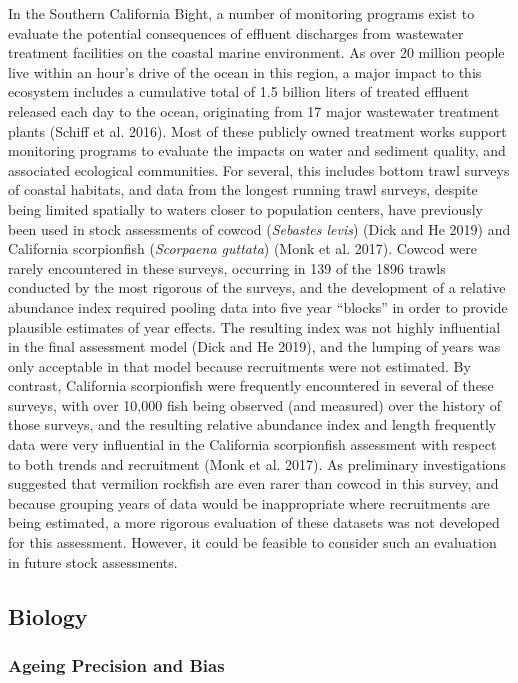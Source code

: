 \documentclass[
  english,
  a4paper,
]{article}
\begin{document}
In the Southern California Bight, a number of monitoring programs exist to evaluate the potential consequences of effluent discharges from wastewater treatment facilities on the coastal marine environment. As over 20 million people live within an hour's drive of the ocean in this region, a major impact to this ecosystem includes a cumulative total of 1.5 billion liters of treated effluent released each day to the ocean, originating from 17 major wastewater treatment plants (Schiff et al. 2016). Most of these publicly owned treatment works support monitoring programs to evaluate the impacts on water and sediment quality, and associated ecological communities. For several, this includes bottom trawl surveys of coastal habitats, and data from the longest running trawl surveys, despite being limited spatially to waters closer to population centers, have previously been used in stock assessments of cowcod (\emph{Sebastes levis}) (Dick and He 2019) and California scorpionfish (\emph{Scorpaena guttata}) (Monk et al. 2017). Cowcod were rarely encountered in these surveys, occurring in 139 of the 1896 trawls conducted by the most rigorous of the surveys, and the development of a relative abundance index required pooling data into five year ``blocks'' in order to provide plausible estimates of year effects. The resulting index was not highly influential in the final assessment model (Dick and He 2019), and the lumping of years was only acceptable in that model because recruitments were not estimated. By contrast, California scorpionfish were frequently encountered in several of these surveys, with over 10,000 fish being observed (and measured) over the history of those surveys, and the resulting relative abundance index and length frequently data were very influential in the California scorpionfish assessment with respect to both trends and recruitment (Monk et al. 2017). As preliminary investigations suggested that vermilion rockfish are even rarer than cowcod in this survey, and because grouping years of data would be inappropriate where recruitments are being estimated, a more rigorous evaluation of these datasets was not developed for this assessment. However, it could be feasible to consider such an evaluation in future stock assessments.

\hypertarget{biology}{%
\subsection{Biology}\label{biology}}

\hypertarget{ageing-precision-and-bias}{%
\subsubsection{Ageing Precision and Bias}\label{ageing-precision-and-bias}}
\end{document}
